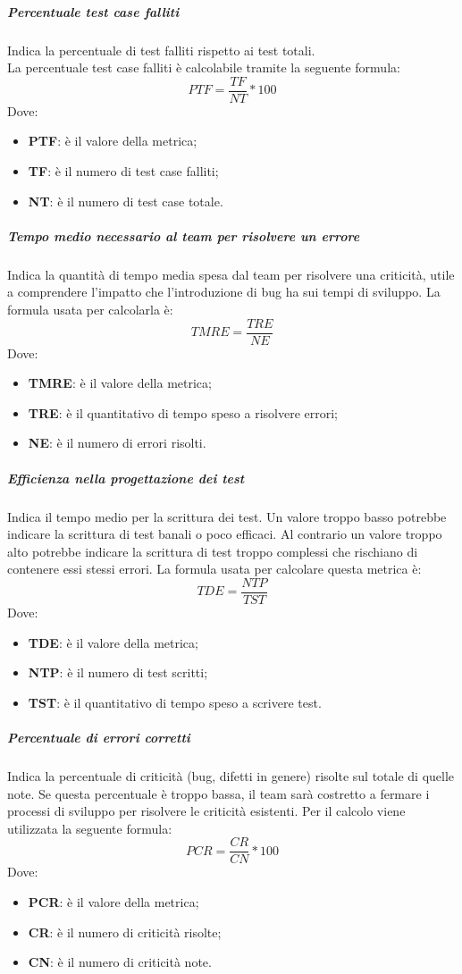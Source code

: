 \subparagraph{Percentuale test case falliti}\Spazio
Indica la percentuale di test falliti rispetto ai test totali.\\
La percentuale test case falliti è calcolabile tramite la seguente formula:
$$PTF=\frac{TF}{NT}*100$$
Dove:
\begin{itemize}
	\item{\textbf{PTF}: è il valore della metrica;}
	\item{\textbf{TF}: è il numero di test case falliti;}
	\item{\textbf{NT}: è il numero di test case totale.}
\end{itemize}

\subparagraph{Tempo medio necessario al team per risolvere un errore}\Spazio
Indica la quantità di tempo media spesa dal team per risolvere una criticità, utile a comprendere
l'impatto che l'introduzione di bug ha sui tempi di sviluppo. La formula usata per calcolarla è:
$$TMRE=\frac{TRE}{NE}$$
Dove:
\begin{itemize}
	\item{\textbf{TMRE}: è il valore della metrica;}
	\item{\textbf{TRE}: è il quantitativo di tempo speso a risolvere errori;}
	\item{\textbf{NE}: è il numero di errori risolti.}
\end{itemize}

\subparagraph{Efficienza nella progettazione dei test}\Spazio
Indica il tempo medio per la scrittura dei test. Un valore troppo basso potrebbe indicare la scrittura di test banali o poco efficaci.
Al contrario un valore troppo alto potrebbe indicare la scrittura di test troppo complessi che rischiano di contenere essi stessi errori.
La formula usata per calcolare questa metrica è:
$$TDE=\frac{NTP}{TST}$$
Dove:
\begin{itemize}
	\item{\textbf{TDE}: è il valore della metrica;}
	\item{\textbf{NTP}: è il numero di test scritti;}
	\item{\textbf{TST}: è il quantitativo di tempo speso a scrivere test.}
\end{itemize}

\subparagraph{Percentuale di errori corretti} \Spazio
Indica la percentuale di criticità (bug, difetti in genere) risolte sul totale di quelle note.
Se questa percentuale è troppo bassa, il team sarà costretto a fermare i processi di sviluppo per risolvere le criticità esistenti.
Per il calcolo viene utilizzata la seguente formula:
$$PCR=\frac{CR}{CN}*100$$
Dove:
\begin{itemize}
	\item{\textbf{PCR}: è il valore della metrica;}
	\item{\textbf{CR}: è il numero di criticità risolte;}
	\item{\textbf{CN}: è il numero di criticità note.}
\end{itemize}

